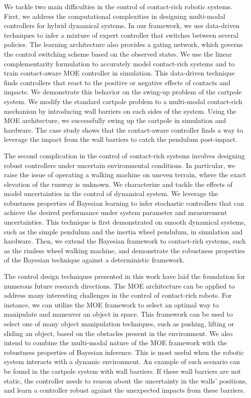 We tackle two main difficulties in the control of contact-rich robotic systems.
%
First, we address the computational complexities in designing multi-modal
controllers for hybrid dynamical systems.
%
In our framework, we use data-driven techniques to infer a mixture of expert
controller that switches between several policies.
%
The learning architecture also provides a gating network, which governs the
control switching scheme based on the observed states.
%
We use the linear complementarity formulation to accurately model contact-rich
systems and to train contact-aware MOE controller in simulation.
%
This data-driven technique finds controllers that react to the positive or
negative effects of contacts and impacts.
%
We demonstrate this behavior on the swing-up problem of the cartpole system.
%
We modify the standard cartpole problem to a multi-modal contact-rich mechanism
by introducing wall barriers on each sides of the system.
%
Using the MOE architecture, we successfully swing up the cartpole in simulation
and hardware.
%
The case study shows that the contact-aware controller finds a way to leverage
the impact from the wall barriers to catch the pendulum post-impact.
%

The second complication in the control of contact-rich systems involves
designing robust controllers under uncertain environmental conditions.
%
In particular, we raise the issue of operating a walking machine on uneven
terrain, where the exact elevation of the runway is unknown.
%
We characterize and tackle the effects of model uncertainties in the control of
dynamical system.
%
We leverage the robustness properties of Bayesian learning to infer stochastic
controllers that can achieve the desired performance under system parameter and
measurement uncertainties.
%
This technique is first demonstrated on smooth dynamical systems, such as the
simple pendulum and the inertia wheel pendulum, in simulation and hardware.
%
Then, we extend the Bayesian framework to contact-rich systems, such as the
rimless wheel walking machine, and demonstrate the robustness properties of the
Bayesian technique against a deterministic framework.

The control design techniques presented in this work have laid the foundation
for numerous future research directions.
%
The MOE architecture can be applied to address many interesting challenges in
the control of contact-rich robots.
%
For instance, we can utilize the MOE framework to select an optimal way to
manipulate and maneuver an object in space.
%
This framework can be used to select one of many object manipulation techniques,
such as pushing, lifting or sliding an object, based on the obstacles present in
the environment.
%
We also intend to combine the multi-modal nature of the MOE framework with the
robustness properties of Bayesian inference. 
%
This is most useful when the robotic system interacts with a dynamic
environment.
%
An example of such scenario can be found in the cartpole system with wall
barriers.
%
If these wall barriers are not static, the controller needs to reason about the
uncertainty in the walls' positions, and learn a controller robust against the
unexpected impacts from these barriers.
